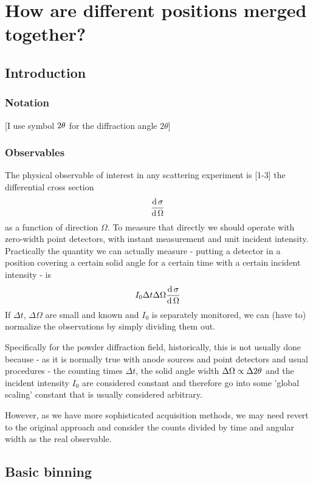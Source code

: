 \section{How are different positions merged together?}\label{sec:merging}



\subsection{Introduction}
\subsubsection{Notation}

[I use symbol ${{2\theta}}$ for the diffraction angle $2\theta$]

\subsubsection{Observables}
The physical observable of interest in any scattering experiment is [1-3] the differential cross section
\[
{\displaystyle{\frac{{\ensuremath{\displaystyle{{\ensuremath{\mathrm{d}{}\, }}\bf{\sigma}}}}}{{\ensuremath{\displaystyle{{\ensuremath{\mathrm{d}{}\, }}\Omega}}}}}}
\]
as a function of direction $\Omega$. 
To measure that directly we should operate with zero-width point detectors, with instant measurement and unit incident intensity. 
Practically 
the quantity we can actually measure - putting a detector in a position covering a certain 
solid angle for a certain time with a certain incident intensity - is
\[
{I_0}\Delta t \Delta\Omega{\ensuremath{\displaystyle{\frac{{\ensuremath{\displaystyle{{\ensuremath{\mathrm{d}{}\, }}\bf{\sigma}}}}}{{\ensuremath{\displaystyle{{\ensuremath{\mathrm{d}{}\, }}\Omega}}}}}}}
\]
If $\Delta t$, $\Delta\Omega$ are small and known and $I_0$ is separately monitored, 
we can (have to) normalize the observations by simply dividing them out. 

Specifically for the powder diffraction field, historically, this is not usually done because
- as it is normally true with anode sources and point detectors and usual procedures - 
the counting times $\Delta t$, the solid angle width $\Delta\Omega\propto \Delta {\ensuremath{{2\theta}}}$ 
and the incident intensity $I_0$ are considered 
constant and therefore go into some 'global scaling' constant that is usually considered arbitrary. 

However, as we have more sophisticated acquisition methods, 
we may need revert to the original approach and consider the 
counts divided by time and angular width as the real observable.

\subsection{Basic binning}\label{sec:11}

